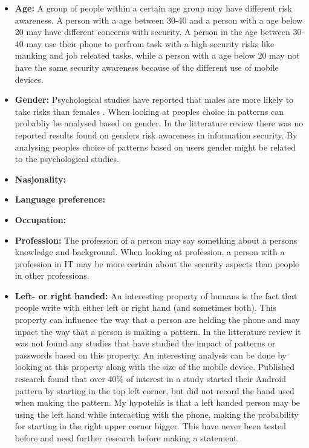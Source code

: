   \begin{itemize}
    \item {\bf Age:} A group of people within a certain age group may have different risk awareness. A person with a age between 30-40 and a person with a age below 20 may have different concerns with security. A person in the age between 30-40 may use their phone to perfrom task with a high security risks like manking and job releated tasks, while a person with a age below 20 may not have the same security awareness because of the different use of mobile devices.
    \item {\bf Gender:} Psychological studies have reported that males are more likely to take risks than females \cite{Byrnes}. When looking at peoples choice in patterns can probabliy be analysed based on gender. In the litterature review there was no reported results found on genders risk awareness in information security. By analysing peoples choice of patterns based on users gender might be related to the psychological studies.
    \item {\bf Nasjonality:} 
    \item {\bf Language preference:}
    \item{\bf Occupation:}
    \item {\bf Profession:} The profession of a person may say something about a persons knowledge and background. When looking at profession, a person with a profession in IT may be more certain about the security aspects than people in other professions. 
    \item {\bf Left- or right handed:} An interesting property of humans is the fact that people write with either left or right hand (and sometimes both). This property can influence the way that a person are helding the phone and may inpact the way that a person is making a pattern. In the litterature review it was not found any studies that have studied the impact of patterns or passwords based on this property. An interesting analysis can be done by looking at this property along with the size of the mobile device. Published research \cite{Uellenbeck} found that over 40\% of interest in a study started their Android pattern by starting in the top left corner, but did not record the hand used when making the pattern. My hypotehis is that a left handed person may be using the left hand while interacting with the phone, making the probability for starting in the right upper corner bigger. This have never been tested before and need further research before making a statement. 

\end{itemize}
